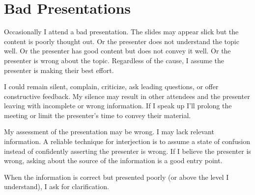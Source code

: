 \section{Bad Presentations}

Occasionally I attend a bad presentation. The slides may appear slick but the content is poorly thought out. Or the presenter does not understand the topic well. Or the presenter has good content but does not convey it well. Or the presenter is wrong about the topic. Regardless of the cause, I assume the presenter is making their best effort. 

I could remain silent, complain, criticize, ask leading questions, or offer constructive feedback. My silence may result in other attendees and the presenter leaving with incomplete or wrong information. If I speak up I'll prolong the meeting or limit the presenter's time to convey their material. 

My assessment of the presentation may be wrong. I may lack relevant information. A reliable technique for interjection is to assume a state of confusion instead of confidently asserting the presenter is wrong. 
If I believe the presenter is wrong, asking about the source of the information is a good entry point.

When the information is correct but presented poorly (or above the level I understand), I ask for clarification. 